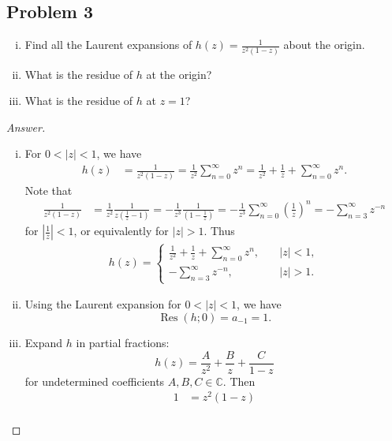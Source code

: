 \documentclass[12pt]{article}
\newcommand{\cx}{\mathbb{C}}
\newcommand\paren[1]{\left( #1 \right)}
\theoremstyle{definition}
\DeclareMathOperator\Res{Res}
\begin{document}
\subsection{Problem 3}
\begin{enumerate}[i)]
    \item Find all the Laurent expansions of $h(z) = \frac{1}{z^2 (1-z)}$ about the origin.
    \item What is the residue of $h$ at the origin?
    \item What is the residue of $h$ at $z = 1$?
\end{enumerate}
\begin{proof}[Answer]
    \noindent
    \begin{enumerate}[i)]
        \item For $0 < |z| < 1$, we have
        \begin{align*}
            h(z) & = \frac{1}{z^2 (1-z)} = \frac{1}{z^2} \sum\limits_{n = 0}^{\infty} z^n = \frac{1}{z^2} + \frac{1}{z} + \sum\limits_{n = 0}^{\infty} z^n.
        \end{align*}
        Note that 
        \begin{align*}
            \frac{1}{z^2 (1-z)} & = \frac{1}{z^2} \frac{1}{z \paren{ \frac{1}{z} - 1 }} = -\frac{1}{z^3} \frac{1}{\paren{1 - \frac{1}{z} }} = -\frac{1}{z^3} \sum\limits_{n = 0}^{\infty} \paren{ \frac{1}{z} }^n = -\sum\limits_{n = 3}^{\infty} z^{-n}
        \end{align*}
        for $\left| \frac{1}{z} \right| < 1$, or equivalently for $|z| > 1$. Thus
        \begin{align*}
            h(z) = 
            \begin{cases}
                \frac{1}{z^2} + \frac{1}{z} + \sum\limits_{n = 0}^{\infty} z^n , & \quad |z| < 1 , \\
                -\sum\limits_{n = 3}^{\infty} z^{-n} , & \quad |z| > 1.
            \end{cases}
        \end{align*}
        \item Using the Laurent expansion for $0 < |z| < 1$, we have 
        \[
            \Res(h;0) = a_{-1} = \boxed{ 1. }
        \]
        \item Expand $h$ in partial fractions:
        \[
            h(z) = \frac{A}{z^2} + \frac{B}{z} + \frac{C}{1-z}
        \]
        for undetermined coefficients $A , B , C \in \cx$. Then 
        \begin{align*}
            1 & = z^2 (1-z) \\

\end{align*}
\end{enumerate}
\end{proof}
\end{document}
